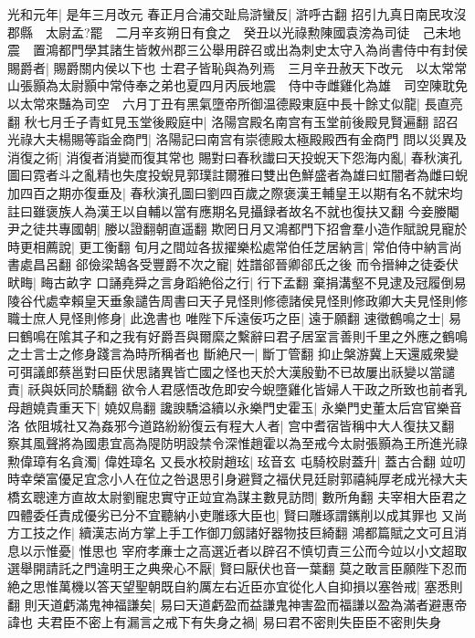 光和元年|{
	是年三月改元}
春正月合浦交趾烏滸蠻反|{
	滸呼古翻}
招引九真日南民攻沒郡縣　太尉孟?罷　二月辛亥朔日有食之　癸丑以光祿勲陳國袁滂為司徒　己未地震　置鴻都門學其諸生皆敇州郡三公舉用辟召或出為刺史太守入為尚書侍中有封侯賜爵者|{
	賜爵關内侯以下也}
士君子皆恥與為列焉　三月辛丑赦天下改元　以太常常山張顥為太尉顥中常侍奉之弟也夏四月丙辰地震　侍中寺雌雞化為雄　司空陳耽免以太常來豔為司空　六月丁丑有黑氣墮帝所御温德殿東庭中長十餘丈似龍|{
	長直亮翻}
秋七月壬子青虹見玉堂後殿庭中|{
	洛陽宫殿名南宫有玉堂前後殿見賢遍翻}
詔召光祿大夫楊賜等詣金商門|{
	洛陽記曰南宫有崇德殿太極殿殿西有金商門}
問以災異及消復之術|{
	消復者消變而復其常也}
賜對曰春秋䜟曰天投蜺天下怨海内亂|{
	春秋演孔圖曰霓者斗之亂精也失度投蜺見郭璞註爾雅曰雙出色鮮盛者為雄曰虹闇者為雌曰蜺}
加四百之期亦復垂及|{
	春秋演孔圖曰劉四百歲之際褒漢王輔皇王以期有名不就宋均註曰雖褒族人為漢王以自輔以當有應期名見攝録者故名不就也復扶又翻}
今妾媵閹尹之徒共專國朝|{
	媵以證翻朝直遥翻}
欺罔日月又鴻都門下招會羣小造作賦說見寵於時更相薦說|{
	更工衡翻}
旬月之間竝各拔擢樂松處常伯任芝居納言|{
	常伯侍中納言尚書處昌呂翻}
郤儉梁鵠各受豐爵不次之寵|{
	姓譜郤晉卿郤氏之後}
而令搢紳之徒委伏畎畮|{
	畮古畝字}
口誦堯舜之言身蹈絶俗之行|{
	行下孟翻}
棄捐溝壑不見逮及冠履倒易陵谷代處幸賴皇天垂象譴告周書曰天子見怪則修德諸侯見怪則修政卿大夫見怪則修職士庶人見怪則修身|{
	此逸書也}
唯陛下斥遠佞巧之臣|{
	遠于願翻}
速徵鶴鳴之士|{
	易曰鶴鳴在隂其子和之我有好爵吾與爾縻之繫辭曰君子居室言善則千里之外應之鶴鳴之士言士之修身踐言為時所稱者也}
斷絶尺一|{
	斷丁管翻}
抑止槃游冀上天還威衆變可弭議郎蔡邕對曰臣伏思諸異皆亡國之怪也天於大漢殷勤不已故屢出祅變以當譴責|{
	祅與妖同於驕翻}
欲令人君感悟改危即安今蜺墮雞化皆婦人干政之所致也前者乳母趙嬈貴重天下|{
	嬈奴鳥翻}
讒諛驕溢續以永樂門史霍玉|{
	永樂門史董太后宫官樂音洛}
依阻城社又為姦邪今道路紛紛復云有程大人者|{
	宫中耆宿皆稱中大人復扶又翻}
察其風聲將為國患宜高為隄防明設禁令深惟趙霍以為至戒今太尉張顥為王所進光祿勲偉璋有名貪濁|{
	偉姓璋名}
又長水校尉趙玹|{
	玹音玄}
屯騎校尉蓋升|{
	蓋古合翻}
竝叨時幸榮富優足宜念小人在位之咎退思引身避賢之福伏見廷尉郭禧純厚老成光禄大夫橋玄聰達方直故太尉劉寵忠實守正竝宜為謀主數見訪問|{
	數所角翻}
夫宰相大臣君之四體委任責成優劣已分不宜聽納小吏雕琢大臣也|{
	賢曰雕琢謂䥴削以成其罪也}
又尚方工技之作|{
	續漢志尚方掌上手工作御刀劔諸好器物技巨綺翻}
鴻都篇賦之文可且消息以示惟憂|{
	惟思也}
宰府孝亷士之高選近者以辟召不慎切責三公而今竝以小文超取選舉開請託之門違明王之典衆心不厭|{
	賢曰厭伏也音一葉翻}
莫之敢言臣願陛下忍而絶之思惟萬機以答天望聖朝既自約厲左右近臣亦宜從化人自抑損以塞咎戒|{
	塞悉則翻}
則天道虧滿鬼神福謙矣|{
	易曰天道虧盈而益謙鬼神害盈而福謙以盈為滿者避惠帝諱也}
夫君臣不密上有漏言之戒下有失身之禍|{
	易曰君不密則失臣臣不密則失身}

